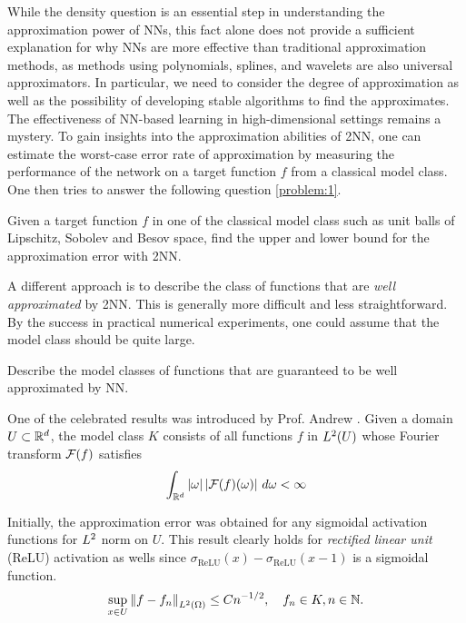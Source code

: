 
While the density question is an essential step in understanding the
approximation power of NNs, this fact alone does not provide a sufficient
explanation for why NNs are more effective than traditional approximation
methods, as methods using polynomials, splines, and wavelets are also universal
approximators. In particular, we need to consider the degree of approximation as
well as the possibility of developing stable algorithms to find the
approximates. The effectiveness of NN-based learning in high-dimensional
settings remains a mystery. To gain insights into the approximation abilities of
2NN, one can estimate the worst-case error rate of approximation by measuring
the performance of the network on a target function $f$ from a classical model
class. One then tries to answer the following question \ref{problem:1}.
\begin{problem}
    \label{problem:1}
    Given a target function $f$ in one of the classical model class such as unit
    balls of Lipschitz, Sobolev and Besov space, find the upper and lower bound
    for the approximation error with 2NN. 
\end{problem}


A different approach is to describe the class of functions that are \textit{well
approximated} by 2NN. This is generally more difficult and less straightforward.
By the success in practical numerical experiments, one could assume that the
model class should be quite large.
\begin{problem}
    \label{problem:2}
    Describe the model classes of functions that are guaranteed to be well
    approximated by NN.
\end{problem}


One of the celebrated results was introduced by Prof. Andrew
\cite{barronApproximationEstimationBounds1994}. Given a domain $U \subset \mathbb{R}^d$,
the model class $K$ consists of all functions $f$ in $L^{2}(U)$ whose Fourier
transform $\mathcal{F}(f)$ satisfies
\begin{equation}
    \int_{\mathbb{R}^d} \left| \omega \right| \left| \mathcal{F}(f)(\omega) \right| \,d\omega < \infty
\end{equation}

Initially, the approximation error was obtained for any sigmoidal activation
functions for $L^{2}$ norm on $U$. This result clearly holds for
\textit{rectified linear unit} (ReLU) activation as wells since
$\sigma_{\text{ReLU}}(x) - \sigma_{\text{ReLU}}(x-1)$ is a sigmoidal function.
\begin{equation}
    \sup_{x \in U} \left\| f - f_n \right\|_{L^{2}(\Omega)} \leq C n^{-1/2}, \quad 
    f_n \in K, n \in \mathbb{N}.
\end{equation}

